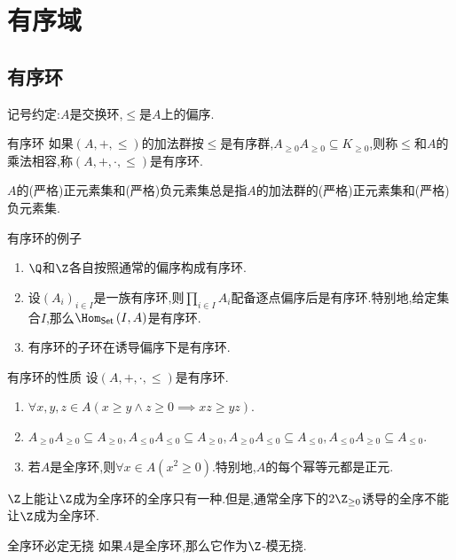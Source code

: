 \chapter{有序域}

\section{有序环}

记号约定:$A$是交换环,$\leq$是$A$上的偏序.

\begin{definition}{有序环}{}
	如果$\left(A,+,\leq\right)$的加法群按$\leqslant$是有序群,$A_{\geq 0}A_{\geq 0}\subseteq K_{\geq 0}$,则称$\leqslant$和$A$的乘法相容,称$\left(A,+,\cdot,\leq\right)$是有序环.
\end{definition}

\begin{remark}{}{}
	$A$的(严格)正元素集和(严格)负元素集总是指$A$的加法群的(严格)正元素集和(严格)负元素集.
\end{remark}

\begin{example}{有序环的例子}{}
	\begin{enumerate}
		\item $\Q$和$\Z$各自按照通常的偏序构成有序环.
		\item 设$\left(A_{i}\right)_{i\in I}$是一族有序环,则$\prod\limits_{i\in I}A_{i}$配备逐点偏序后是有序环.特别地,给定集合$I$,那么$\Hom_{\mathsf{Set}}\left(I,A\right)$是有序环.
		\item 有序环的子环在诱导偏序下是有序环.
	\end{enumerate}
\end{example}

\begin{proposition}{有序环的性质}{}
	设$\left(A,+,\cdot,\leq\right)$是有序环.
	\begin{enumerate}
		\item $\forall x,y,z\in A\left(x\geq y\wedge z\geq 0\implies xz\geq yz\right)$.
		\item $A_{\geq 0}A_{\geq 0}\subseteq A_{\geq 0},A_{\leq 0}A_{\leq 0}\subseteq A_{\geq 0},A_{\geq 0}A_{\leq 0}\subseteq A_{\leq 0},A_{\leq 0}A_{\geq 0}\subseteq A_{\leq 0}$.
		\item 若$A$是全序环,则$\forall x\in A\left(x^{2}\geq 0\right)$.特别地,$A$的每个幂等元都是正元.
	\end{enumerate}
\end{proposition}

\begin{example}{}{}
	$\Z$上能让$\Z$成为全序环的全序只有一种.但是,通常全序下的$2\Z_{\geq 0}$诱导的全序不能让$\Z$成为全序环.
\end{example}

\begin{proposition}{全序环必定无挠}{}
	如果$A$是全序环,那么它作为$\Z$-模无挠.
\end{proposition}